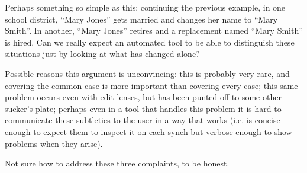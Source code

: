Perhaps something so simple as this: continuing the previous example, in one
school district, ``Mary Jones'' gets married and changes her name to ``Mary
Smith''. In another, ``Mary Jones'' retires and a replacement named ``Mary
Smith'' is hired. Can we really expect an automated tool to be able to
distinguish these situations just by looking at what has changed alone?

Possible reasons this argument is unconvincing: this is probably very rare,
and covering the common case is more important than covering every case;
this same problem occurs even with edit lenses, but has been punted off to
some other sucker's plate; perhaps even in a tool that handles this problem
it is hard to communicate these subtleties to the user in a way that works
(i.e. is concise enough to expect them to inspect it on each synch but
verbose enough to show problems when they arise).

Not sure how to address these three complaints, to be honest.
